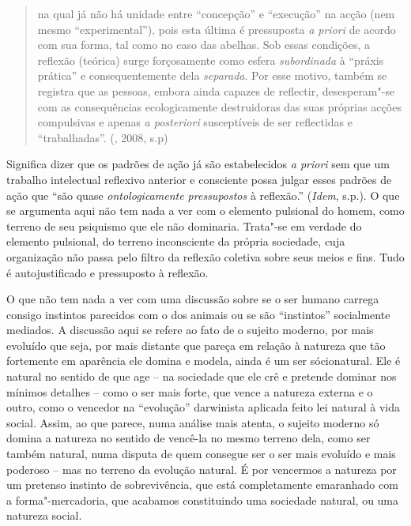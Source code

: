 \begin{quote}
na qual já não há unidade entre ``concepção'' e ``execução'' na acção
(nem mesmo ``experimental''), pois esta última é pressuposta \emph{a
priori} de acordo com sua forma, tal como no caso das abelhas. Sob essas
condições, a reflexão (teórica) surge forçosamente como esfera
\emph{subordinada} à ``práxis prática'' e consequentemente dela
\emph{separada}. Por esse motivo, também se registra que as pessoas,
embora ainda capazes de reflectir, desesperam"-se com as consequências
ecologicamente destruidoras das suas próprias acções compulsivas e
apenas \emph{a posteriori} susceptíveis de ser reflectidas e
``trabalhadas''. (, 2008, s.p)
\end{quote}

Significa dizer que os padrões de ação já são estabelecidos \emph{a
priori} sem que um trabalho intelectual reflexivo anterior e consciente
possa julgar esses padrões de ação que ``são quase \emph{ontologicamente
pressupostos} à reflexão.'' (\emph{Idem}, s.p.). O que se argumenta aqui
não tem nada a ver com o elemento pulsional do homem, como terreno de
seu psiquismo que ele não dominaria. Trata"-se em verdade do elemento
pulsional, do terreno inconsciente da própria sociedade, cuja
organização não passa pelo filtro da reflexão coletiva sobre seus meios
e fins. Tudo é autojustificado e pressuposto à reflexão.

O que não tem nada a ver com uma discussão sobre se o ser humano carrega
consigo instintos parecidos com o dos animais ou se são ``instintos''
socialmente mediados. A discussão aqui se refere ao fato de o sujeito
moderno, por mais evoluído que seja, por mais distante que pareça em
relação à natureza que tão fortemente em aparência ele domina e modela,
ainda é um ser sócionatural. Ele é natural no sentido de que age -- na
sociedade que ele crê e pretende dominar nos mínimos detalhes -- como o
ser mais forte, que vence a natureza externa e o outro, como o vencedor
na ``evolução'' darwinista aplicada feito lei natural à vida social.
Assim, ao que parece, numa análise mais atenta, o sujeito moderno só
domina a natureza no sentido de vencê-la no mesmo terreno dela, como ser
também natural, numa disputa de quem consegue ser o ser mais evoluído e
mais poderoso -- mas no terreno da evolução natural. É por vencermos a
natureza por um pretenso instinto de sobrevivência, que está
completamente emaranhado com a forma"-mercadoria, que acabamos
constituindo uma sociedade natural, ou uma natureza social.

